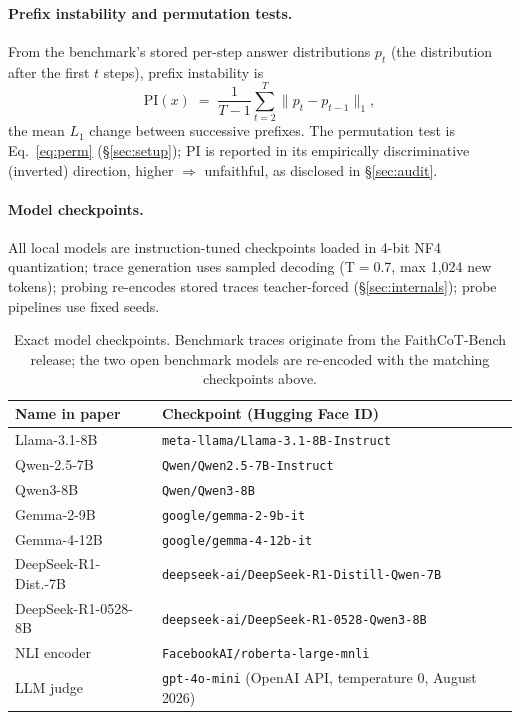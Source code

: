 \documentclass[11pt]{article}
\begin{document}
\paragraph{Prefix instability and permutation tests.} From the benchmark's stored per-step answer distributions $p_t$ (the distribution after the first $t$ steps), prefix instability is
\begin{equation}\label{eq:pi}
\mathrm{PI}(x) \;=\; \frac{1}{T-1}\sum_{t=2}^{T}\bigl\lVert p_t - p_{t-1}\bigr\rVert_1,
\end{equation}
the mean $L_1$ change between successive prefixes. The permutation test is Eq.~\ref{eq:perm} (\S\ref{sec:setup}); PI is reported in its empirically discriminative (inverted) direction, higher $\Rightarrow$ unfaithful, as disclosed in \S\ref{sec:audit}.

\paragraph{Model checkpoints.} All local models are instruction-tuned checkpoints loaded in 4-bit NF4 quantization; trace generation uses sampled decoding (T$=$0.7, max 1{,}024 new tokens); probing re-encodes stored traces teacher-forced (\S\ref{sec:internals}); probe pipelines use fixed seeds.
\begin{table}[t]
\centering
\small
\begin{tabular}{@{}ll@{}}
\toprule
\textbf{Name in paper} & \textbf{Checkpoint (Hugging Face ID)} \\
\midrule
Llama-3.1-8B & \texttt{meta-llama/Llama-3.1-8B-Instruct} \\
Qwen-2.5-7B & \texttt{Qwen/Qwen2.5-7B-Instruct} \\
Qwen3-8B & \texttt{Qwen/Qwen3-8B} \\
Gemma-2-9B & \texttt{google/gemma-2-9b-it} \\
Gemma-4-12B & \texttt{google/gemma-4-12b-it} \\
DeepSeek-R1-Dist.-7B & \texttt{deepseek-ai/DeepSeek-R1-Distill-Qwen-7B} \\
DeepSeek-R1-0528-8B & \texttt{deepseek-ai/DeepSeek-R1-0528-Qwen3-8B} \\
NLI encoder & \texttt{FacebookAI/roberta-large-mnli} \\
LLM judge & \texttt{gpt-4o-mini} (OpenAI API, temperature 0, August 2026) \\
\bottomrule
\end{tabular}
\caption{Exact model checkpoints. Benchmark traces originate from the FaithCoT-Bench release; the two open benchmark models are re-encoded with the matching checkpoints above.}
\label{tab:checkpoints}
\end{table}
\end{document}

